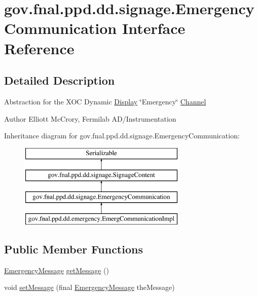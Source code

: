 \hypertarget{interfacegov_1_1fnal_1_1ppd_1_1dd_1_1signage_1_1EmergencyCommunication}{\section{gov.\-fnal.\-ppd.\-dd.\-signage.\-Emergency\-Communication Interface Reference}
\label{interfacegov_1_1fnal_1_1ppd_1_1dd_1_1signage_1_1EmergencyCommunication}
}


\subsection{Detailed Description}
Abstraction for the X\-O\-C Dynamic \hyperlink{interfacegov_1_1fnal_1_1ppd_1_1dd_1_1signage_1_1Display}{Display} \char`\"{}\-Emergency\char`\"{} \hyperlink{interfacegov_1_1fnal_1_1ppd_1_1dd_1_1signage_1_1Channel}{Channel}

\begin{DoxyAuthor}{Author}
Elliott Mc\-Crory, Fermilab A\-D/\-Instrumentation 
\end{DoxyAuthor}
Inheritance diagram for gov.\-fnal.\-ppd.\-dd.\-signage.\-Emergency\-Communication\-:\begin{figure}[H]
\begin{center}
\leavevmode
\includegraphics[height=4.000000cm]{interfacegov_1_1fnal_1_1ppd_1_1dd_1_1signage_1_1EmergencyCommunication}
\end{center}
\end{figure}
\subsection*{Public Member Functions}
\begin{DoxyCompactItemize}
\item 
\hyperlink{classgov_1_1fnal_1_1ppd_1_1dd_1_1emergency_1_1EmergencyMessage}{Emergency\-Message} \hyperlink{interfacegov_1_1fnal_1_1ppd_1_1dd_1_1signage_1_1EmergencyCommunication_af923d219d82208a1ca4d947b8b726c56}{get\-Message} ()
\item 
void \hyperlink{interfacegov_1_1fnal_1_1ppd_1_1dd_1_1signage_1_1EmergencyCommunication_a11be4fd4ad5cada5a16903ba022d706b}{set\-Message} (final \hyperlink{classgov_1_1fnal_1_1ppd_1_1dd_1_1emergency_1_1EmergencyMessage}{Emergency\-Message} the\-Message)
\end{DoxyCompactItemize}


